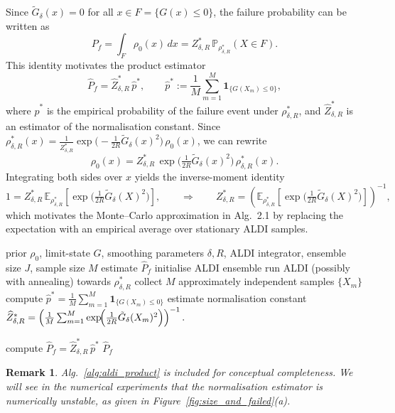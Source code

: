 \documentclass[a4paper]{article}
\numberwithin{equation}{section}
\newtheorem{remark}[theorem]{Remark}
\begin{document}
Since $\tilde G_\delta(x)=0$ for all $x\in F=\{G(x)\le 0\}$, the failure
probability can be written as
\[
P_f
= \int_F \rho_0(x)\,dx
= Z^*_{\delta,R}\,
  \mathbb P_{\rho^*_{\delta,R}}(X\in F).
\]
This identity motivates the product estimator
\[
  \widehat P_f
  = \widehat Z^*_{\delta,R}\,
    \widehat p^*,
  \qquad
  \widehat p^*
  := \frac{1}{M}\sum_{m=1}^M
      \mathbf{1}_{\{G(X_m)\le 0\}},
\]
where $\widehat p^*$ is the empirical probability of the failure event under
$\rho^*_{\delta,R}$, and $\widehat Z^*_{\delta,R}$ is an estimator of the
normalisation constant. Since $\rho^*_{\delta,R}(x)=\frac{1}{Z^*_{\delta,R}}\exp\!\big(-\tfrac{1}{2R}\tilde G_\delta(x)^2\big)\,\rho_0(x)$, we can rewrite
\[
\rho_0(x)=Z^*_{\delta,R}\,\exp\!\big(\tfrac{1}{2R}\tilde G_\delta(x)^2\big)\,\rho^*_{\delta,R}(x).
\]
Integrating both sides over $x$ yields the inverse-moment identity
\[
1 = Z^*_{\delta,R}\,\mathbb E_{\rho^*_{\delta,R}}\!\left[\exp\!\big(\tfrac{1}{2R}\tilde G_\delta(X)^2\big)\right],
\qquad\Rightarrow\qquad
Z^*_{\delta,R}=\left(\mathbb E_{\rho^*_{\delta,R}}\!\left[\exp\!\big(\tfrac{1}{2R}\tilde G_\delta(X)^2\big)\right]\right)^{-1},
\]
which motivates the Monte--Carlo approximation in Alg.~2.1 by replacing the expectation with an empirical average over stationary ALDI samples.

\begin{algorithm}[t]
\caption{ALDI-based product estimator for $P_f$}
\label{alg:aldi_product}
\begin{algorithmic}[1]
\Require prior $\rho_0$, limit-state $G$, smoothing parameters $\delta,R$,
         ALDI integrator, ensemble size $J$, sample size $M$
\Ensure estimate $\widehat P_f$
\State initialise ALDI ensemble
\State run ALDI (possibly with annealing) towards $\rho^*_{\delta,R}$
\State collect $M$ approximately independent samples $\{X_m\}$
\State compute
       $\displaystyle
        \widehat p^*=
        \frac{1}{M}\sum_{m=1}^M \mathbf{1}_{\{G(X_m)\le 0\}}$
\State estimate normalisation constant $\widehat Z^*_{\delta,R}
=
\left(
\frac{1}{M}\sum_{m=1}^M
\exp\!\Bigl(\tfrac{1}{2R}\tilde G_\delta(X_m)^2\Bigr)
\right)^{-1}.
$
       
\State compute $\widehat P_f=\widehat Z^*_{\delta,R}\,\widehat p^*$
\State \Return $\widehat P_f$
\end{algorithmic}
\end{algorithm}

\begin{remark}
Alg.~\ref{alg:aldi_product} is included for conceptual completeness. We will see in the numerical experiments that the normalisation estimator is numerically unstable, as given in Figure~\ref{fig:size_and_failed}(a).
\end{remark}
\end{document}
